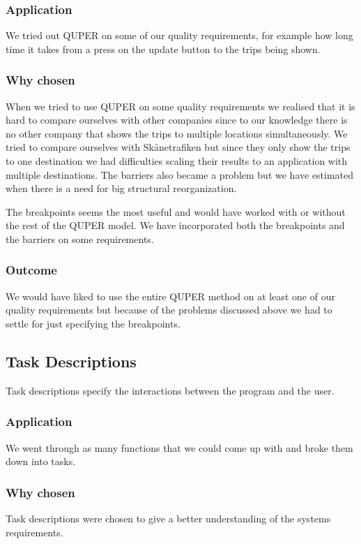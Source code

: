 \documentclass[a4paper]{article}
\begin{document}
			\subsubsection{Application}
			We tried out QUPER on some of our quality requirements, for example how long time it takes from a press on the update button to the trips being shown.
			\subsubsection{Why chosen}
			When we tried to use QUPER on some quality requirements we realised that it is hard to compare ourselves with other companies since to our knowledge there is no other company that shows the trips to multiple locations simultaneously. We tried to compare ourselves with Skånetrafiken but since they only show the trips to one destination we had difficulties scaling their results to an application with multiple destinations. The barriers also became a problem but we have estimated when there is a need for big structural reorganization. 
			
			The breakpoints seems the most useful and would have worked with or without the rest of the QUPER model. We have incorporated both the breakpoints and the barriers on some requirements.

			\subsubsection{Outcome}
			We would have liked to use the entire QUPER method on at least one of our quality requirements but because of the problems discussed above we had to settle for just specifying the breakpoints.		
		
		
		\subsection{Task Descriptions}
			Task descriptions specify the interactions between the program and the user.

			\subsubsection{Application}
				We went through as many functions that we could come up with and broke them down into tasks.
			\subsubsection{Why chosen}
				Task descriptions were chosen to give a better understanding of the systems requirements.
\end{document}
